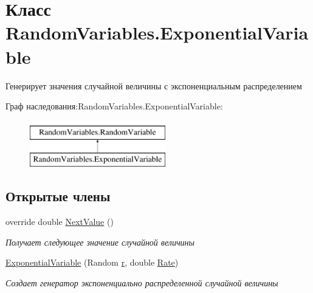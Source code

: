 \hypertarget{class_random_variables_1_1_exponential_variable}{}\section{Класс Random\+Variables.\+Exponential\+Variable}
\label{class_random_variables_1_1_exponential_variable}


Генерирует значения случайной величины с экспоненциальным распределением  


Граф наследования\+:Random\+Variables.\+Exponential\+Variable\+:\begin{figure}[H]
\begin{center}
\leavevmode
\includegraphics[height=2.000000cm]{class_random_variables_1_1_exponential_variable}
\end{center}
\end{figure}
\subsection*{Открытые члены}
\begin{DoxyCompactItemize}
\item 
override double \hyperlink{class_random_variables_1_1_exponential_variable_a90d692fd128609d68cf87f4ff47c7a2d}{Next\+Value} ()
\begin{DoxyCompactList}\small\item\em Получает следующее значение случайной величины \end{DoxyCompactList}\item 
\hyperlink{class_random_variables_1_1_exponential_variable_aa4339d52050bbae1268e7de5d51c5506}{Exponential\+Variable} (Random \hyperlink{class_random_variables_1_1_random_variable_a8a79eb7a1676b85b74906831b2850cb9}{r}, double \hyperlink{class_random_variables_1_1_exponential_variable_a158140032c03acf367981db02dde135a}{Rate})
\begin{DoxyCompactList}\small\item\em Создает генератор экспоненциально распределенной случайной величины \end{DoxyCompactList}\end{DoxyCompactItemize}
